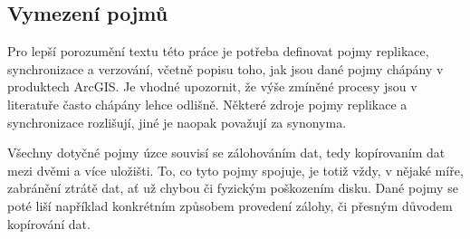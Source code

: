         \subsection{Vymezení pojmů}
        Pro lepší porozumění textu této práce je potřeba definovat pojmy replikace,
        synchronizace a verzování, včetně popisu toho, jak jsou dané pojmy chápány v
        produktech ArcGIS. Je vhodné upozornit, že výše zmíněné procesy jsou v
        literatuře často chápány lehce odlišně. Některé zdroje pojmy replikace a
        synchronizace rozlišují, jiné je naopak považují za synonyma. 

        Všechny dotyčné pojmy úzce souvisí se zálohováním dat, tedy kopírovaním dat
        mezi dvěmi a více uložišti. To, co tyto pojmy spojuje, je totiž vždy, v nějaké
        míře, zabránění ztrátě dat, ať už chybou či fyzickým poškozením disku. Dané
        pojmy se poté liší například konkrétním způsobem provedení zálohy, či přesným
        důvodem kopírování dat. 

